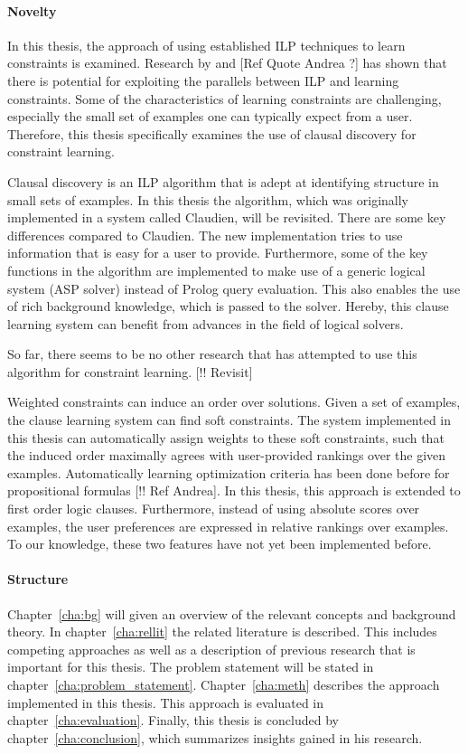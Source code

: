 \paragraph{Novelty}
In this thesis, the approach of using established ILP techniques to learn constraints is examined. Research by \cite{Lallouet:LearningCP} and [Ref Quote Andrea ?] has shown that there is potential for exploiting the parallels between ILP and learning constraints. Some of the characteristics of learning constraints are challenging, especially the small set of examples one can typically expect from a user. Therefore, this thesis specifically examines the use of clausal discovery for constraint learning.

Clausal discovery is an ILP algorithm that is adept at identifying structure in small sets of examples. In this thesis the algorithm, which was originally implemented in a system called Claudien, will be revisited. There are some key differences compared to Claudien. The new implementation tries to use information that is easy for a user to provide. Furthermore, some of the key functions in the algorithm are implemented to make use of a generic logical system (ASP solver) instead of Prolog query evaluation. This also enables the use of rich background knowledge, which is passed to the solver. Hereby, this clause learning system can benefit from advances in the field of logical solvers.

So far, there seems to be no other research that has attempted to use this algorithm for constraint learning. [!! Revisit]

Weighted constraints can induce an order over solutions. Given a set of examples, the clause learning system can find soft constraints. The system implemented in this thesis can automatically assign weights to these soft constraints, such that the induced order maximally agrees with user-provided rankings over the given examples. Automatically learning optimization criteria has been done before for propositional formulas [!! Ref Andrea]. In this thesis, this approach is extended to first order logic clauses. Furthermore, instead of using absolute scores over examples, the user preferences are expressed in relative rankings over examples. To our knowledge, these two features have not yet been implemented before.

\paragraph{Structure}
Chapter~\ref{cha:bg} will given an overview of the relevant concepts and background theory. In chapter~\ref{cha:rellit} the related literature is described. This includes competing approaches as well as a description of previous research that is important for this thesis. The problem statement will be stated in chapter~\ref{cha:problem_statement}. Chapter~\ref{cha:meth} describes the approach implemented in this thesis. This approach is evaluated in chapter~\ref{cha:evaluation}. Finally, this thesis is concluded by chapter~\ref{cha:conclusion}, which summarizes insights gained in his research.